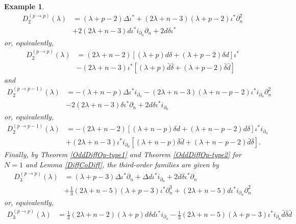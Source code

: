 \documentclass[a4paper,12pt,reqno]{amsart}
\newtheorem{example}[theorem]{Example}
\numberwithin{theorem}{subsection}
\numberwithin{equation}{section}
\begin{document}
\begin{example}
\begin{align*}
   D^{(p \to p)}_2(\lambda) & = (\lambda\!+\!p\!-\!2) \Delta \iota^*
   +(2\lambda\!+\!n\!-\!3)(\lambda\!+\!p\!-\!2)\iota^* \partial_n^2 \\
   & + 2(2\lambda\!+\!n\!-\!3){d}\iota^* i_{\partial_n}\partial_n+2{d}\delta \iota^*
\end{align*}
or, equivalently,
\begin{align*}
   D^{(p \to p)}_2(\lambda) & =
   (2\lambda\!+\!n\!-\!2) \left[(\lambda\!+\!p) {d} \delta + (\lambda\!+\!p\!-\!2)\delta {d} \right]\iota^*\\
   & -(2\lambda\!+\!n\!-\!3) \iota^*
   \left[(\lambda\!+\!p) \bar{d} \bar{\delta} + (\lambda\!+p\!-\!2)\bar{\delta} \bar{d} \right]
\end{align*}
and
\begin{align*}
   D^{(p \to p-1)}_2(\lambda) & = -(\lambda\!+\!n\!-\!p) \Delta \iota^*i_{\partial_n}
   - (2\lambda\!+\!n\!-\!3)(\lambda\!+\!n\!-\!p\!-\!2) \iota^* i_{\partial_n}
   \partial_n^2 \\ & -2(2\lambda\!+\!n\!-\!3)\delta\iota^*\partial_n+2 {d} \delta\iota^* i_{\partial_n}
\end{align*}
or, equivalently,
\begin{align*}
   D^{(p \to p-1)}_2(\lambda) & = -(2\lambda\!+\!n\!-\!2)
   \left[(\lambda\!+\!n\!-\!p)\delta {d} + (\lambda\!+\!n\!-\!p\!-\!2) {d} \delta\right] \iota^* i_{\partial_n}\\
   & + (2\lambda\!+\!n\!-\!3) \iota^* i_{\partial_n}
   \left[(\lambda\!+\!n\!-\!p)\bar{\delta} \bar{d} + (\lambda\!+\!n\!-\!p\!-\!2)\bar{d}\bar{\delta}
   \right].
\end{align*}
Finally, by Theorem \ref{OddDiffOp-type1} and Theorem \ref{OddDiffOp-type2} for
$N=1$ and Lemma \ref{DiffCoDiff}, the third-order families are given by
\begin{align*}
   D^{(p \to p)}_3(\lambda) & =(\lambda\!+\!p\!-\!3) \Delta \iota^*\partial_n
   + \Delta {d} \iota^ *i_{\partial_n} + 2{d} \delta \iota^*\partial_n \\
   & + \tfrac 13(2\lambda\!+\!n\!-\!5)(\lambda\!+\!p\!-\!3) \iota^*\partial_n^3
   + (2\lambda\!+\!n\!-\!5){d}\iota^*i_{\partial_n}\partial_n^2
\end{align*}
or, equivalently,
\begin{align*}
   D^{(p \to p)}_3(\lambda)
   & = \tfrac 13(2\lambda\!+\!n\!-\!2)(\lambda\!+\!p) {d}\delta {d} \iota^* i_{\partial_n}
   - \tfrac 13(2\lambda\!+\!n\!-\!5)(\lambda\!+\!p\!-\!3)\iota^* i_{\partial_n}\bar{d} \bar{\delta} \bar{d}\\

\end{align*}
\end{example}
\end{document}

